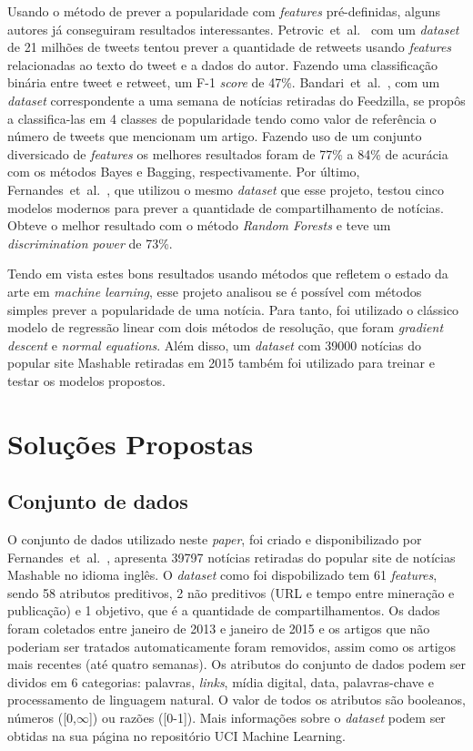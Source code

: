 \documentclass[10pt,twocolumn,letterpaper]{article}
\newcommand{\CITEN}[2]{\mbox{#1 et al. \cite{#2}}}
\begin{document}
Usando o método de prever a popularidade com \textit{features} pré-definidas, alguns autores já conseguiram resultados interessantes. \CITEN{Petrovic}{sp} com um \textit{dataset} de 21 milhões de tweets tentou prever a quantidade de retweets usando \textit{features} relacionadas ao texto do tweet e a dados do autor. Fazendo uma classificação binária entre tweet e retweet, um F-1 \textit{score} de 47\%. \CITEN{Bandari}{rb}, com um \textit{dataset} correspondente a uma semana de notícias retiradas do Feedzilla, se propôs a classifica-las em 4 classes de popularidade tendo como valor de referência o número de tweets que mencionam um artigo. Fazendo uso de um conjunto diversicado de \textit{features} os melhores resultados foram de 77\% a 84\% de acurácia com os métodos Bayes e Bagging, respectivamente.
Por último, \CITEN{Fernandes}{kf}, que utilizou o mesmo \textit{dataset} que esse projeto, testou cinco modelos modernos para prever a quantidade de compartilhamento de notícias. Obteve o melhor resultado com o método \textit{Random Forests} e teve um \textit{discrimination power} de 73\%.

Tendo em vista estes bons resultados usando métodos que refletem o estado da arte em \textit{machine learning}, esse projeto analisou se é possível com métodos simples prever a popularidade de uma notícia. Para tanto, foi utilizado o clássico modelo de regressão linear com dois métodos de resolução, que foram \textit{gradient descent} e \textit{normal equations}. Além disso, um \textit{dataset} com 39000 notícias do popular site Mashable retiradas em 2015 também foi utilizado para treinar e testar os modelos propostos.

\section{Soluções Propostas}

\subsection{Conjunto de dados}

O conjunto de dados utilizado neste \textit{paper}, foi criado e disponibilizado por \CITEN{Fernandes}{kf}, apresenta 39797 notícias retiradas do popular site de notícias Mashable no idioma inglês. O \textit{dataset} como foi dispobilizado tem 61 \textit{features}, sendo 58 atributos preditivos, 2 não preditivos (URL e tempo entre mineração e publicação) e 1 objetivo, que é a quantidade de compartilhamentos. Os dados foram coletados entre janeiro de 2013 e janeiro de 2015 e os artigos que não poderiam ser tratados automaticamente foram removidos, assim como os artigos mais recentes (até quatro semanas). Os atributos do conjunto de dados podem ser dividos em 6 categorias: palavras, \textit{links}, mídia digital, data, palavras-chave e processamento de linguagem natural. O valor de todos os atributos são booleanos, números ([0,$\infty$]) ou razões ([0-1]). Mais informações sobre o \textit{dataset} podem ser obtidas na sua página no repositório UCI Machine Learning.
\end{document}
